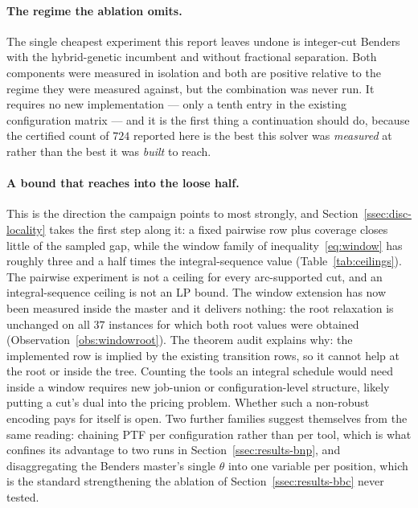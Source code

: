 \paragraph{The regime the ablation omits.}
The single cheapest experiment this report leaves undone is integer-cut Benders with the
hybrid-genetic incumbent and without fractional separation. Both components were measured
in isolation and both are positive relative to the regime they were measured against, but
the combination was never run. It requires no new implementation --- only a tenth entry in
the existing configuration matrix --- and it is the first thing a continuation should do,
because the certified count of $724$ reported here is the best this solver was
\emph{measured} at rather than the best it was \emph{built} to reach.

\paragraph{A bound that reaches into the loose half.}
This is the direction the campaign points to most strongly, and
Section~\ref{ssec:disc-locality} takes the first step along it: a fixed pairwise row
plus coverage closes little of the sampled gap, while the window family of
inequality~\eqref{eq:window} has roughly three and a half times the integral-sequence
value (Table~\ref{tab:ceilings}). The pairwise experiment is not a ceiling for every
arc-supported cut, and an integral-sequence ceiling is not an LP bound. The window
extension has now been measured inside the master
and it delivers nothing: the root relaxation is unchanged on all $37$ instances for
which both root values were obtained
(Observation~\ref{obs:windowroot}). The theorem audit explains why: the implemented
row is implied by the existing transition rows, so it cannot help at the root or
inside the tree. Counting the tools an integral schedule would need inside a window
requires new job-union or configuration-level structure, likely putting a cut's dual
into the pricing problem. Whether such a non-robust encoding pays for itself is open.
Two further
families suggest themselves from the same
reading: chaining PTF per configuration rather than per tool, which is what confines
its advantage to two runs in Section~\ref{ssec:results-bnp}, and disaggregating the
Benders master's single $\theta$ into one variable per position, which is the standard
strengthening the ablation of Section~\ref{ssec:results-bbc} never tested.

